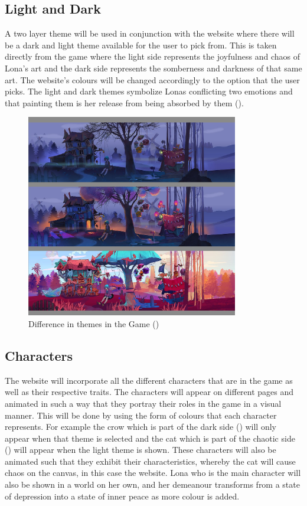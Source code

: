 \documentclass{article}
\begin{document}
    \subsection{Light and Dark}
    \begin{flushleft}
    A two layer theme will be used in conjunction with the website where there will be a dark and light theme available for the user to pick from. This is taken directly from the game where the light side represents the joyfulness and chaos of Lona's art and the dark side represents the somberness and darkness of that same art. The website's colours will be changed accordingly to the option that the user picks. The light and dark themes symbolize Lonas conflicting two emotions and that painting them is her release from being absorbed by them (\cite{lonaweb}).
    \bigskip
    
    \begin{figure}[h]
    \centering
    \caption{Difference in themes in the Game (\cite{lonatwitter})}
    \includegraphics[width=350px]{Theme_Contrast.jpg}
    \end{figure}
    \end{flushleft}

    \subsection{Characters}
    \begin{flushleft}
    The website will incorporate all the different characters that are in the game as well as their respective traits. The characters will appear on different pages and animated in such a way that they portray their roles in the game in a visual manner. This will be done by using the form of colours that each character represents. For example the crow which is part of the dark side (\cite{kickstarter}) will only appear when that theme is selected and the cat which is part of the chaotic side (\cite{kickstarter}) will appear when the light theme is shown. These characters will also be animated such that they exhibit their characteristics, whereby the cat will cause chaos on the canvas, in this case the website. 
    Lona who is the main character will also be shown in a world on her own, and her demeanour transforms from a state of depression into a state of inner peace as more colour is added. 
    \end{flushleft}
    
\end{document}
